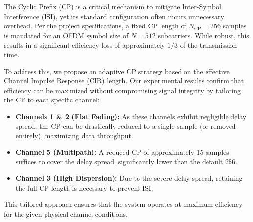 \begin{idea}
    The Cyclic Prefix (CP) is a critical mechanism to mitigate Inter-Symbol Interference (ISI), yet its standard configuration often incurs unnecessary overhead.
    Per the project specifications, a fixed CP length of $N_{\text{CP}} = 256$ samples is mandated for an OFDM symbol size of $N = 512$ subcarriers. While robust, this results in a significant efficiency loss of approximately $1/3$ of the transmission time.
    
    To address this, we propose an adaptive CP strategy based on the effective Channel Impulse Response (CIR) length.
    Our experimental results confirm that efficiency can be maximized without compromising signal integrity by tailoring the CP to each specific channel:
    \begin{itemize}
        \item \textbf{Channels 1 \& 2 (Flat Fading):} As these channels exhibit negligible delay spread, the CP can be drastically reduced to a single sample (or removed entirely), maximizing data throughput.
        \item \textbf{Channel 5 (Multipath):} A reduced CP of approximately 15 samples suffices to cover the delay spread, significantly lower than the default 256.
        \item \textbf{Channel 3 (High Dispersion):} Due to the severe delay spread, retaining the full CP length is necessary to prevent ISI.
    \end{itemize}
    This tailored approach ensures that the system operates at maximum efficiency for the given physical channel conditions.
\end{idea}